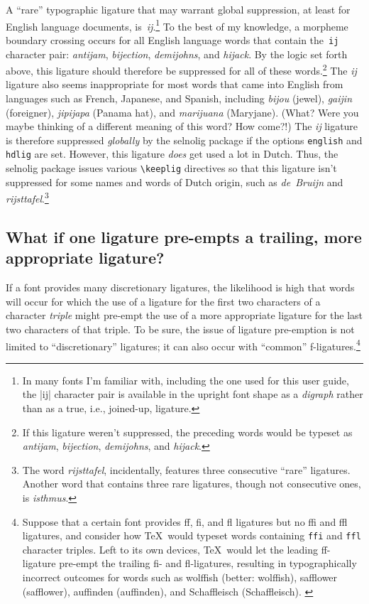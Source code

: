 \documentclass[11pt]{article}
\newcommand{\pkg}[1]{\textsf{#1}}
\newcommand{\opt}[1]{\texttt{#1}}
\newcommand{\cmmd}[1]{\texttt{\textbackslash #1}}
\begin{document}
A \enquote{rare} typographic ligature that may warrant global suppression, at least for English language documents, is~\mbox{\emph{ij}}.\footnote{In many fonts I'm familiar with, including the one used for this user guide, the |ij| character pair is available in the upright font shape as a \emph{digraph} rather than as a true, i.e., joined-up, ligature.} To the best of my knowledge, a morpheme boundary crossing occurs for all English language words that contain the~\opt{ij} character pair: \emph{antijam}, \emph{bijection}, \emph{demijohns}, and \emph{hijack}. By the logic set forth above, this ligature should therefore be suppressed for all of these words.\footnote{If this ligature weren't suppressed, the preceding words would be typeset as \emph{ant\mbox{ij}am}, \emph{b\mbox{ij}ection}, \emph{dem\mbox{ij}ohns}, and \emph{h\mbox{ij}ack}.} The \mbox{\emph{ij}} ligature also seems inappropriate for most words that came into English from languages such as French, Japanese, and Spanish, including \emph{bijou} (jewel), \emph{gaijin} (foreigner), \emph{jipijapa} (Panama hat), and \emph{marijuana} (Maryjane). (What? Were you maybe thinking of a different meaning of this word? How come?!) The \mbox{\emph{ij}} ligature is therefore suppressed \emph{globally} by the \pkg{selnolig} package if the options \opt{english} and \opt{hdlig} are set.
However, this ligature \emph{does} get used a lot in Dutch. Thus, the \pkg{selnolig} package issues various \cmmd{keeplig} directives so that this ligature isn't suppressed for some names and words of Dutch origin, such as \emph{de~Bruijn} and \emph{rijsttafel}.\footnote{The word \emph{rijsttafel}, incidentally, features three consecutive \enquote{rare} ligatures. Another word that contains three rare ligatures, though not consecutive ones, is \emph{\mbox{is}thmus}. }



\subsection{What if one ligature pre-empts a trailing, more appropriate ligature?} \label{sec:preempt}

If a font provides many discretionary ligatures, the likelihood is high that words will occur for which the use of a ligature for the first two characters of a character \emph{triple} might pre-empt the use of a more appropriate ligature for the last two characters of that triple. To be sure, the issue of ligature pre-emption is not limited to \enquote{discretionary} ligatures; it can also occur with \enquote{common} f-ligatures.\footnote{Suppose that a certain font provides ff, fi, and fl ligatures but no ffi and ffl ligatures, and consider how \TeX\ would typeset words containing \opt{ffi} and \opt{ffl} character triples. Left to its own devices, \TeX\ would let the leading ff-ligature pre-empt the trailing fi- and fl-ligatures, resulting in typographically incorrect outcomes for words such as wol\mbox{ff}ish (better: wolf\mbox{fi}sh), sa\mbox{ff}lower (safflower), au\mbox{ff}inden (auffinden), and Scha\mbox{ff}leisch (Schaffleisch). \label{fn:triple}} 
\end{document}
